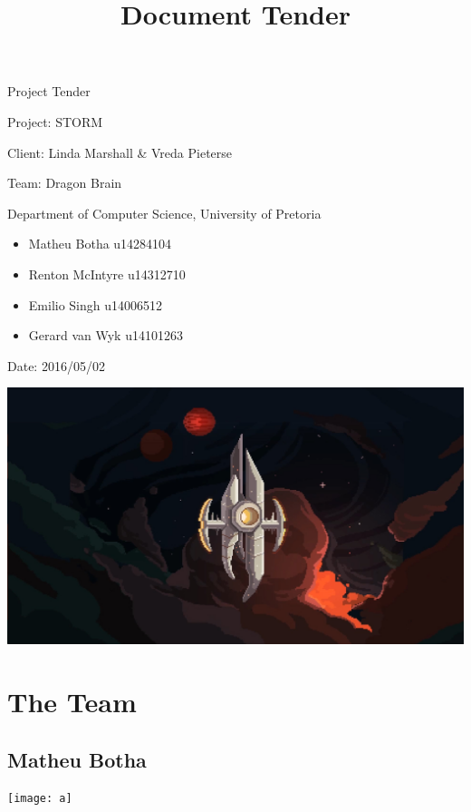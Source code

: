 \documentclass[12pt]{article}
\begin{document}
\title{Document Tender}

\begin{titlepage}
\begin{huge}
\begin{center}
Project Tender

Project: STORM
\\
\begin{LARGE}
Client: Linda Marshall \& Vreda Pieterse
\end{LARGE}

Team: Dragon Brain
\\
\begin{small}
Department of Computer Science, University of Pretoria
\\
\begin{itemize}
\item Matheu Botha u14284104
\item Renton McIntyre u14312710
\item Emilio Singh u14006512
\item Gerard van Wyk u14101263
\end{itemize}


Date: 2016/05/02

\end{small}

\includegraphics[scale=0.2]{test}
\end{center}

\end{huge}


\end{titlepage}

\pagebreak

\section{The Team}
\subsection{Matheu Botha}
\texttt{[image: a]}
\end{document}
